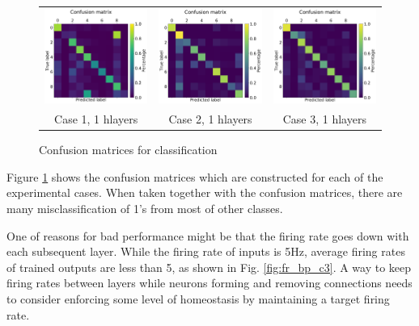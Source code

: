 \documentclass[preprint,12pt]{elsarticle}
\begin{document}
\begin{figure}[tbh]
    \centering
    \begin{centering}
    \begin{tabular}{ccc}
        \includegraphics[width=0.30\linewidth, trim=0cm 0cm 0cm 1.5cm, clip=true]{mnist_confusion_matrix_rate_based_case_1_rate_pynn8_1dlayers_3x_20200217}&
        \includegraphics[width=0.30\linewidth, trim=0cm 0cm 0cm 1.5cm, clip=true]{mnist_confusion_matrix_rate_based_case_2_rate_pynn8_1dlayers_3x_20200217}&
        \includegraphics[width=0.30\linewidth, trim=0cm 0cm 0cm 1.5cm, clip=true]{mnist_confusion_matrix_rate_based_case_3_rate_pynn8_1dlayers_2x_20200217}\\
        Case 1, 1 hlayers & Case 2, 1 hlayers & Case 3, 1 hlayers
        \end{tabular}
     \end{centering}
     \caption{Confusion matrices for classification}
     \label{fig:confmat}
    \vspace{-10pt}
\end{figure}

Figure \ref{fig:confmat} shows the confusion matrices which are constructed for each of the experimental cases.
When taken together with the confusion matrices, there are many misclassification of 1's from most of other classes.


One of reasons for bad performance might be that the firing rate goes down with each subsequent layer. While the firing rate of inputs is 5Hz, average firing rates of trained outputs are less than 5, as shown in Fig. \ref{fig:fr_bp_c3}. A way to keep firing rates between layers while neurons forming and removing connections needs to consider enforcing some level of  homeostasis by maintaining a target firing rate.
\end{document}
